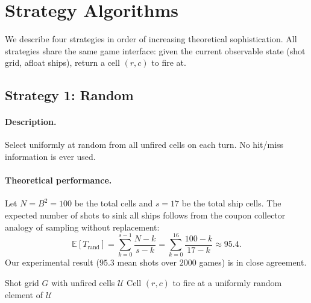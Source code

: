 \documentclass[12pt,a4paper]{article}
\newcommand{\E}{\mathbb{E}}
\newcommand{\1}{\mathbf{1}}
\begin{document}
\section{Strategy Algorithms}
\label{sec:algorithms}

We describe four strategies in order of increasing theoretical sophistication.
All strategies share the same game interface: given the current observable state
(shot grid, afloat ships), return a cell $(r, c)$ to fire at.

\subsection{Strategy 1: Random}

\paragraph{Description.}
Select uniformly at random from all unfired cells on each turn.  No hit/miss
information is ever used.

\paragraph{Theoretical performance.}
Let $N = B^2 = 100$ be the total cells and $s = 17$ be the total ship cells.  The
expected number of shots to sink all ships follows from the coupon collector
analogy of sampling without replacement:
\begin{equation}
  \E[T_{\text{rand}}] = \sum_{k=0}^{s-1} \frac{N-k}{s-k}
    = \sum_{k=0}^{16} \frac{100-k}{17-k} \approx 95.4.
  \label{eq:random_theory}
\end{equation}
Our experimental result ($95.3$ mean shots over $2000$ games) is in close agreement.

\begin{algorithm}[H]
  \caption{Random Strategy}
  \begin{algorithmic}[1]
    \Require Shot grid $G$ with unfired cells $\mathcal{U}$
    \Ensure Cell $(r,c)$ to fire at
    \State \Return a uniformly random element of $\mathcal{U}$
  \end{algorithmic}
\end{algorithm}
\end{document}
